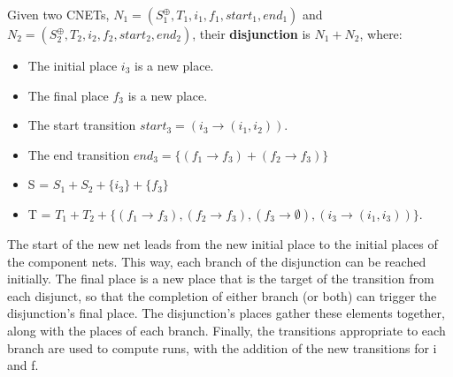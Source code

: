 \begin{definition}
  \label{def:OR-PN}
  Given two CNETs, $N_1= (S_1^\oplus, T_1, i_1, f_1, start_1, end_1)$ and $N_2= (S_2^\oplus, T_2, i_2, f_2, start_2, end_2)$, their \textbf{disjunction} is $N_1 + N_2$, where:  
  \begin{itemize}
  \item The initial place $i_3$ is a new place.
  \item The final place $f_3$ is a new place.
  \item The start transition $start_3 = (i_3 \to (i_1, i_2))$.
  \item The end transition $end_3 = \{(f_1 \to f_3) + (f_2 \to f_3)\}$ 
  \item S = $S_1 + S_2 + \{i_3\} + \{f_3\}$ 
  \item T = $T_1 + T_2 + \{(f_1 \to f_3), (f_2 \to f_3),  (f_3 \to \emptyset), (i_3 \to (i_1, i_3))\}$.
  \end{itemize}  
  The start of the new net leads from the new initial place to the initial places of the component nets. This way, each branch of the disjunction
  can be reached initially. The final place is a new place that is the
  target of the transition from each disjunct, so that the completion of
  either branch (or both) can trigger the disjunction's final place. The
  disjunction's places gather these elements together, along with the
  places of each branch. Finally, the transitions appropriate
  to each branch are used to compute runs, with the addition of the new
  transitions for i and f.
\end{definition}

